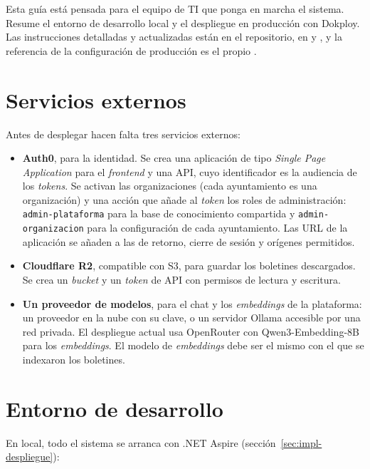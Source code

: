 \label{ap:despliegue}

Esta guía está pensada para el equipo de TI que ponga en marcha el sistema. Resume el entorno de desarrollo local y el despliegue en producción con Dokploy. Las instrucciones detalladas y actualizadas están en el repositorio, en  y , y la referencia de la configuración de producción es el propio .

\section{Servicios externos}

Antes de desplegar hacen falta tres servicios externos:

\begin{itemize}
  \item \textbf{Auth0}, para la identidad. Se crea una aplicación de tipo \emph{Single Page Application} para el \emph{frontend} y una API, cuyo identificador es la audiencia de los \emph{tokens}. Se activan las organizaciones (cada ayuntamiento es una organización) y una acción que añade al \emph{token} los roles de administración: \texttt{admin-plataforma} para la base de conocimiento compartida y \texttt{admin-organizacion} para la configuración de cada ayuntamiento. Las URL de la aplicación se añaden a las de retorno, cierre de sesión y orígenes permitidos.
  \item \textbf{Cloudflare R2}, compatible con S3, para guardar los boletines descargados. Se crea un \emph{bucket} y un \emph{token} de API con permisos de lectura y escritura.
  \item \textbf{Un proveedor de modelos}, para el chat y los \emph{embeddings} de la plataforma: un proveedor en la nube con su clave, o un servidor Ollama accesible por una red privada. El despliegue actual usa OpenRouter con Qwen3-Embedding-8B para los \emph{embeddings}. El modelo de \emph{embeddings} debe ser el mismo con el que se indexaron los boletines.
\end{itemize}

\section{Entorno de desarrollo}

En local, todo el sistema se arranca con .NET Aspire (sección~\ref{sec:impl-despliegue}):

